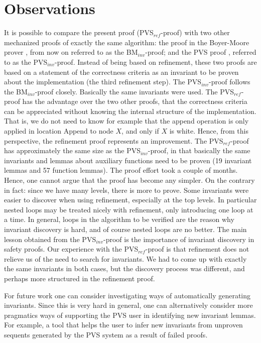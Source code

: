 
\newcommand{\bm}{BM$_{inv}$}
\newcommand{\pvsinv}{PVS$_{inv}$}
\newcommand{\pvsref}{PVS$_{ref}$}
\newcommand{\unity}{UNITY$_{ref}$}


\section{Observations}
\label{observations}

It is possible  to compare the  present proof (\pvsref-proof) with two
other  mechanized proofs of exactly  the same algorithm:  the proof in
the Boyer-Moore prover \cite{Rus:GC},  from now on  referred to as the
\bm-proof; and   the  PVS proof   \cite{havelund-pvs-gc-99},  
referred  to as  the \pvsinv-proof.  Instead of being based on refinement, these two proofs
are  based on a statement of  the correctness criteria as an invariant
to be  proven about the  implementation (the third refinement step)\@. 
The \pvsinv-proof follows  the \bm-proof closely.  Basically  the same
invariants were used. The \pvsref-proof has the advantage over the two
other proofs, that the correctness criteria can be appreciated without
knowing the internal structure of  the implementation.  That is, we do
not need to know for example that the append operation is only applied
in location  {\sc  Append} to node  $X$,  and only  if  $X$ is white.  
Hence, from  this  perspective,  the  refinement proof  represents  an
improvement.  The \pvsref-proof has approximately the same size as the
\pvsinv-proof, in that basically  the same invariants and lemmas about
auxiliary functions  need to  be proven (19   invariant lemmas and  57
function lemmas). The  proof effort took a couple   of months.  Hence,
one  cannot argue that  the proof   has  become any  simpler.   On the
contrary in fact: since  we have many levels, there  is more to prove. 
Some   invariants were easier   to   discover when using   refinement,
especially  at the  top  levels. In  particular  nested  loops may  be
treated  nicely with refinement, only introducing  one loop at a time. 
In general, loops in  the algorithm to be  verified are the reason why
invariant discovery is hard, and of course nested loops are no better.
The main lesson  obtained from the \pvsinv-proof  is the importance of
invariant discovery in   safety   proofs.  Our experience  with    the
\pvsref-proof is  that refinement does not  relieve us of  the need to
search for   invariants. We  had to  come   up with exactly   the same
invariants in both cases, but the discovery process was different, and
perhaps more structured in the refinement proof.

For future  work one can  consider investigating ways of automatically
generating  invariants.  Since this is very  hard in  general, one can
alternatively consider more pragmatics ways of supporting the PVS user
in identifying new invariant  lemmas. For example,  a tool that  helps
the  user to infer new  invariants from unproven sequents generated by
the PVS system as a result of failed proofs.


